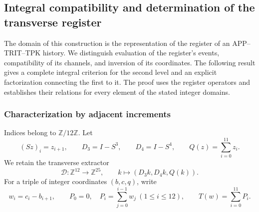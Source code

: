 \subsection{Integral compatibility and determination of the transverse register}
\label{img09:seccion}

The domain of this construction is the representation of the register of an
APP--TRIT--TPK history. We distinguish evaluation of the register's events,
compatibility of its channels, and inversion of its
coordinates. The following result gives a complete integral criterion for
the second level and an explicit factorization connecting the first to it.
The proof uses the register operators and establishes their
relations for every element of the stated integer domains.

\subsubsection{Characterization by adjacent increments}

Indices belong to $\mathbb Z/12\mathbb Z$. Let
\[
 (Sz)_i=z_{i+1},\qquad D_3=I-S^3,\qquad D_4=I-S^4,
 \qquad Q(z)=\sum_{i=0}^{11}z_i.
\]
We retain the transverse extractor
\[
 \mathcal D:\mathbb Z^{12}\longrightarrow\mathbb Z^{25},
 \qquad k\longmapsto(D_3k,D_4k,Q(k)).
\]
For a triple of integer coordinates $(b,c,q)$, write
\begin{equation}
 w_i=c_i-b_{i+1},\qquad
 P_0=0,\quad P_i=\sum_{j=0}^{i-1}w_j\ (1\leq i\leq12),
 \qquad T(w)=\sum_{i=0}^{11}P_i.
 \label{img09:incremento}
\end{equation}

